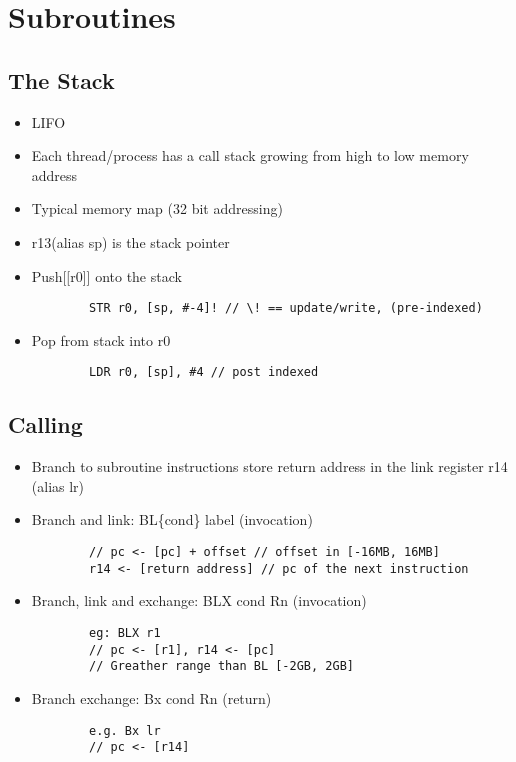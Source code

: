 \section{Subroutines}
  \subsection{The Stack}
    \begin{itemize}
      \item LIFO
      \item Each thread/process has a call stack growing from high to low
      memory address
      \item Typical memory map (32 bit addressing)
      \item r13(alias sp) is the stack pointer
      \item Push[[r0]] onto the stack
      \begin{lstlisting}
        STR r0, [sp, #-4]! // \! == update/write, (pre-indexed)
      \end{lstlisting}
      \item Pop from stack into r0
      \begin{lstlisting}
        LDR r0, [sp], #4 // post indexed
      \end{lstlisting}
    \end{itemize}

  \subsection{Calling}
    \begin{itemize}
      \item Branch to subroutine instructions store return address in the link
      register r14 (alias lr)
      \item Branch and link: BL\{cond\} label (invocation)
      \begin{lstlisting}
        // pc <- [pc] + offset // offset in [-16MB, 16MB]
        r14 <- [return address] // pc of the next instruction
      \end{lstlisting}
      \item Branch, link and exchange: BLX {cond} Rn (invocation)
      \begin{lstlisting}
        eg: BLX r1
        // pc <- [r1], r14 <- [pc]
        // Greather range than BL [-2GB, 2GB]
      \end{lstlisting}
    \item Branch exchange: Bx {cond} Rn (return)
      \begin{lstlisting}
        e.g. Bx lr
        // pc <- [r14]
      \end{lstlisting}
    \end{itemize}

